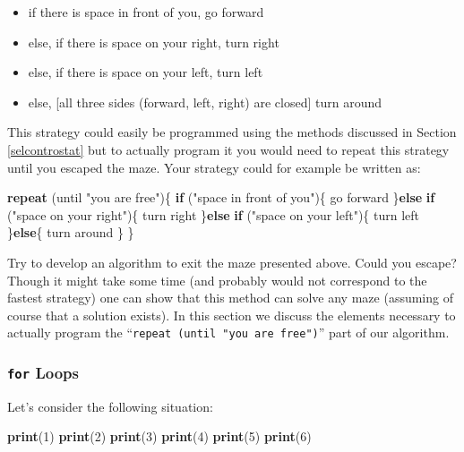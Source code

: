 \documentclass[12pt,]{krantz}
\newenvironment{Shaded}{\begin{snugshade}}{\end{snugshade}}
\newcommand{\KeywordTok}[1]{\textcolor[rgb]{0.27,0.27,0.27}{\textbf{#1}}}
\newcommand{\DecValTok}[1]{\textcolor[rgb]{0.06,0.06,0.06}{#1}}
\newcommand{\StringTok}[1]{\textcolor[rgb]{0.5,0.5,0.5}{#1}}
\newcommand{\ControlFlowTok}[1]{\textcolor[rgb]{0.27,0.27,0.27}{\textbf{#1}}}
\newcommand{\NormalTok}[1]{#1}
\providecommand{\tightlist}{%
  \setlength{\itemsep}{0pt}\setlength{\parskip}{0pt}}
\begin{document}
\begin{itemize}
\tightlist
\item
  if there is space in front of you, go forward
\item
  else, if there is space on your right, turn right
\item
  else, if there is space on your left, turn left
\item
  else, {[}all three sides (forward, left, right) are closed{]} turn
  around
\end{itemize}

This strategy could easily be programmed using the methods discussed in
Section \ref{selcontrostat} but to actually program it you would need to
repeat this strategy until you escaped the maze. Your strategy could for
example be written as:

\begin{Shaded}
\begin{Highlighting}[]
\ControlFlowTok{repeat}\NormalTok{ (until }\StringTok{"you are free"}\NormalTok{)\{}
  \ControlFlowTok{if}\NormalTok{ (}\StringTok{"space in front of you"}\NormalTok{)\{}
\NormalTok{    go forward}
\NormalTok{  \}}\ControlFlowTok{else} \ControlFlowTok{if}\NormalTok{ (}\StringTok{"space on your right"}\NormalTok{)\{}
\NormalTok{    turn right }
\NormalTok{  \}}\ControlFlowTok{else} \ControlFlowTok{if}\NormalTok{ (}\StringTok{"space on your left"}\NormalTok{)\{}
\NormalTok{    turn left}
\NormalTok{  \}}\ControlFlowTok{else}\NormalTok{\{}
\NormalTok{    turn around}
\NormalTok{  \}}
\NormalTok{\}}
\end{Highlighting}
\end{Shaded}

Try to develop an algorithm to exit the maze presented above. Could you
escape? Though it might take some time (and probably would not
correspond to the fastest strategy) one can show that this method can
solve any maze (assuming of course that a solution exists). In this
section we discuss the elements necessary to actually program the
``\texttt{repeat\ (until\ "you\ are\ free")}'' part of our algorithm.

\subsubsection{\texorpdfstring{\texttt{for}
Loops}{for Loops}}\label{forloop}

Let's consider the following situation:

\begin{Shaded}
\begin{Highlighting}[]
\KeywordTok{print}\NormalTok{(}\DecValTok{1}\NormalTok{)}
\KeywordTok{print}\NormalTok{(}\DecValTok{2}\NormalTok{)}
\KeywordTok{print}\NormalTok{(}\DecValTok{3}\NormalTok{)}
\KeywordTok{print}\NormalTok{(}\DecValTok{4}\NormalTok{)}
\KeywordTok{print}\NormalTok{(}\DecValTok{5}\NormalTok{)}
\KeywordTok{print}\NormalTok{(}\DecValTok{6}\NormalTok{)}
\end{Highlighting}
\end{Shaded}
\end{document}
